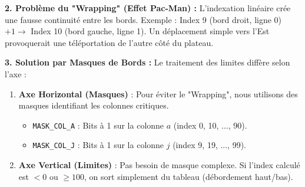 \documentclass[a4paper]{article}
\begin{document}
\textbf{2. Problème du "Wrapping" (Effet Pac-Man) :}
L'indexation linéaire crée une fausse continuité entre les bords. Exemple : Index 9 (bord droit, ligne 0) $+ 1 \rightarrow$ Index 10 (bord gauche, ligne 1). Un déplacement simple vers l'Est provoquerait une téléportation de l'autre côté du plateau.

\begin{center}
\end{center}

\textbf{3. Solution par Masques de Bords :}
Le traitement des limites diffère selon l'axe :
\begin{enumerate}
    \item \textbf{Axe Horizontal (Masques)} : Pour éviter le "Wrapping", nous utilisons des masques identifiant les colonnes critiques.
    \begin{itemize}[noitemsep]
        \item \texttt{MASK\_COL\_A} : Bits à 1 sur la colonne $a$ (index 0, 10, ..., 90).
        \item \texttt{MASK\_COL\_J} : Bits à 1 sur la colonne $j$ (index 9, 19, ..., 99).
    \end{itemize}
    \item \textbf{Axe Vertical (Limites)} : Pas besoin de masque complexe. Si l'index calculé est $< 0$ ou $\ge 100$, on sort simplement du tableau (débordement haut/bas).
\end{enumerate}
\end{document}
